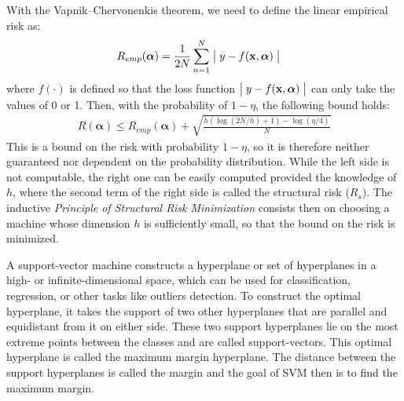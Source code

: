 \documentclass[11pt]{article}
\begin{document}
\begin{tcolorbox}[colback=CrispBlue!5!white,colframe=CrispBlue!75!black,title=4. Enunciate and interpret the VC theorem that describes the bound on the actual risk.]
With the Vapnik–Chervonenkis theorem, we need to define the linear empirical risk as:
\begin{align}
	R_{emp}(\bm{\alpha}) &=\frac{1}{2N}\sum_{n=1}^{N} \bigm\lvert y-f(\bm{\mathrm{x}},\bm{\alpha}) \bigm\rvert
\end{align}
where \( f(\cdot) \) is defined so that the loss function \( \bigm\lvert y-f(\bm{\mathrm{x}},\bm{\alpha}) \bigm\rvert \) can only take the values of 0 or 1. Then, with the probability of \( 1-\eta \), the following bound holds:
\begin{align}
	R(\bm{\alpha}) \leq R_{emp}(\bm{\alpha}) + \sqrt{\frac{h(\log(2N/h)+1)-\log(\eta / 4)}{N}}
\end{align}
This is a bound on the risk with probability \( 1-\eta \), so it is therefore neither guaranteed nor dependent on the probability distribution. While the left side is not computable, the right one can be easily computed provided the knowledge of \( h \), where the second term of the right side is called the structural risk (\( R_s \)). The inductive \textit{Principle of Structural Risk Minimization} consists then on choosing a machine whose dimension \( h \) is sufficiently small, so that the bound on the risk is minimized.
\end{tcolorbox}

\begin{tcolorbox}[colback=CrispBlue!5!white,colframe=CrispBlue!75!black,title=5. Introduce the SVM criteria.]
A support-vector machine constructs a hyperplane or set of hyperplanes in a high- or infinite-dimensional space, which can be used for classification, regression, or other tasks like outliers detection. To construct the optimal hyperplane, it takes the support of two other hyperplanes that are parallel and equidistant from it on either side. These two support hyperplanes lie on the most extreme points between the classes and are called support-vectors. This optimal hyperplane is called the maximum margin hyperplane. The distance between the support hyperplanes is called the margin and the goal of SVM then is to find the maximum margin.
\end{tcolorbox}
\end{document}
